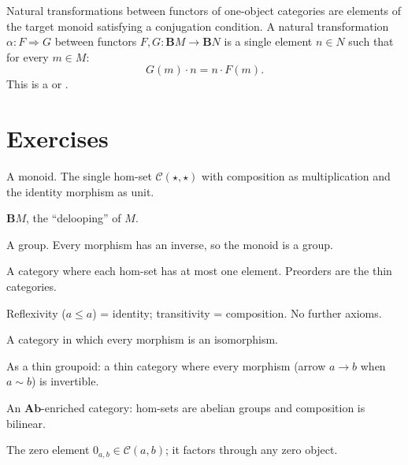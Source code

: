 Natural transformations between functors of one-object categories are
elements of the target monoid satisfying a conjugation condition. A natural
transformation $\alpha : F \Rightarrow G$ between functors
$F, G : \mathbf{B}M \to \mathbf{B}N$ is a single element $n \in N$ such that
for every $m \in M$:
\[
  G(m) \cdot n = n \cdot F(m).
\]
This is a  or .

\section{Exercises}

\begin{exercisesbox}
\begin{qa}
       {A monoid. The single hom-set $\mathcal{C}(\star,\star)$ with composition
        as multiplication and the identity morphism as unit.}

       {$\mathbf{B}M$, the ``delooping'' of $M$.}

       {A group. Every morphism has an inverse, so the monoid is a group.}

       {A category where each hom-set has at most one element. Preorders are
        the thin categories.}

       {Reflexivity ($a \leq a$) = identity; transitivity = composition. No further axioms.}

       {A category in which every morphism is an isomorphism.}

       {As a thin groupoid: a thin category where every morphism (arrow $a \to b$
        when $a \sim b$) is invertible.}

       {An $\mathbf{Ab}$-enriched category: hom-sets are abelian groups and
        composition is bilinear.}

       {The zero element $0_{a,b} \in \mathcal{C}(a,b)$; it factors through
        any zero object.}


\end{qa}
\end{exercisesbox}
